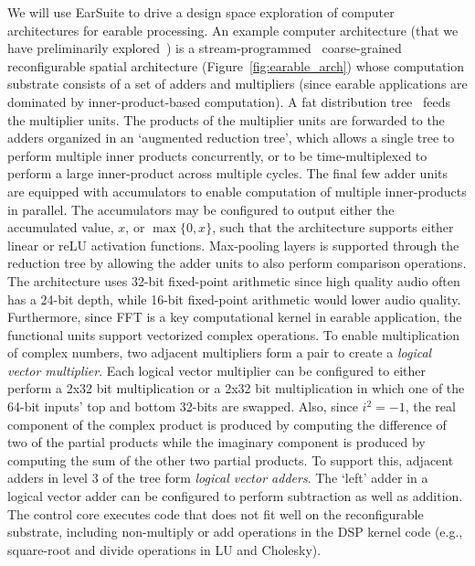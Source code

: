  We will use EarSuite to drive a design space exploration of computer architectures for earable processing. An example computer architecture (that we have preliminarily explored~\cite{}) is  a
stream-programmed~\cite{nowatzki2017stream} coarse-grained reconfigurable
spatial architecture (Figure~\ref{fig:earable_arch}) whose 
computation substrate consists of a set of  adders and multipliers (since earable applications are dominated by inner-product-based computation).
 A fat distribution
tree~\cite{leiserson1985fat}  feeds the multiplier units.  The products
of the multiplier units are forwarded to the adders organized in an `augmented
reduction tree', which allows a single tree to perform multiple inner
products concurrently, or to be time-multiplexed to perform a large inner-product across multiple cycles.
The final few adder units are equipped
with accumulators to enable computation of multiple inner-products in parallel. The accumulators may be configured to output either
the accumulated value, $x$, or $\max{\{0, x\}}$, such that the architecture supports
either linear or reLU activation functions.  Max-pooling
layers is supported through the reduction tree by allowing the adder units to also perform
comparison operations.
 The architecture  uses  32-bit fixed-point arithmetic since high quality audio
often has a 24-bit depth, while 16-bit fixed-point arithmetic would %
lower audio quality. 
Furthermore, since FFT is a key computational kernel in earable application, the
functional units support vectorized complex operations. To enable 
multiplication of complex numbers, two adjacent multipliers form a pair to create a  {\em
logical vector multiplier}.
Each logical vector multiplier can be configured to either perform a 2x32 bit multiplication or a 2x32 bit
multiplication in which one of the 64-bit inputs' top and bottom 32-bits are
swapped.
Also, since $i^2 = -1$, the real component of
the complex product is produced by computing the difference
of two of the partial products while the imaginary component is produced by
computing the sum of the other two partial products. To support this,  adjacent adders in level 3 of the tree
form  \textit{logical vector adders}. The `left' adder in a logical vector adder can
be configured to perform subtraction as well as addition.
The control core executes code that does not fit
well on the reconfigurable substrate, including non-multiply
or add operations in the DSP kernel code (e.g., square-root and divide operations in LU and Cholesky). 

